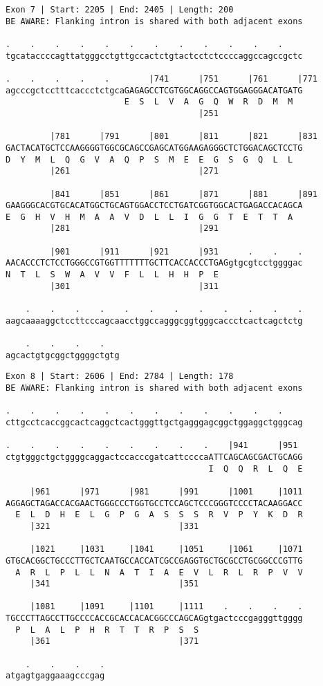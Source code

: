 \documentclass{article}
\begin{document}
\begin{Verbatim}[fontfamily=courier]
Exon 7 | Start: 2205 | End: 2405 | Length: 200
BE AWARE: Flanking intron is shared with both adjacent exons

.    .    .    .    .    .    .    .    .    .    .    .    
tgcataccccagttatgggcctgttgccactctgtactcctctccccaggccagccgctc

.    .    .    .    .        |741      |751      |761      |771
agcccgctcctttcaccctctgcaGAGAGCCTCGTGGCAGGCCAGTGGAGGGACATGATG
                        E  S  L  V  A  G  Q  W  R  D  M  M  
                                       |251                 

         |781      |791      |801      |811      |821      |831
GACTACATGCTCCAAGGGGTGGCGCAGCCGAGCATGGAAGAGGGCTCTGGACAGCTCCTG
D  Y  M  L  Q  G  V  A  Q  P  S  M  E  E  G  S  G  Q  L  L  
         |261                          |271                 

         |841      |851      |861      |871      |881      |891
GAAGGGCACGTGCACATGGCTGCAGTGGACCTCCTGATCGGTGGCACTGAGACCACAGCA
E  G  H  V  H  M  A  A  V  D  L  L  I  G  G  T  E  T  T  A  
         |281                          |291                 

         |901      |911      |921      |931      .    .    .
AACACCCTCTCCTGGGCCGTGGTTTTTTTGCTTCACCACCCTGAGgtgcgtcctggggac
N  T  L  S  W  A  V  V  F  L  L  H  H  P  E                 
         |301                          |311                 

    .    .    .    .    .    .    .    .    .    .    .    .
aagcaaaaggctccttcccagcaacctggccagggcggtgggcaccctcactcagctctg

    .    .    .    .   
agcactgtgcggctggggctgtg
\end{Verbatim}
\newpage
\begin{Verbatim}[fontfamily=courier]
Exon 8 | Start: 2606 | End: 2784 | Length: 178
BE AWARE: Flanking intron is shared with both adjacent exons

.    .    .    .    .    .    .    .    .    .    .    .    
cttgcctcaccggcactcaggctcactgggttgctgagggagcggctggaggctgggcag

.    .    .    .    .    .    .    .    .    |941      |951 
ctgtgggctgctggggcaggactccacccgatcattccccaATTCAGCAGCGACTGCAGG
                                         I  Q  Q  R  L  Q  E

     |961      |971      |981      |991      |1001     |1011
AGGAGCTAGACCACGAACTGGGCCCTGGTGCCTCCAGCTCCCGGGTCCCCTACAAGGACC
  E  L  D  H  E  L  G  P  G  A  S  S  S  R  V  P  Y  K  D  R
     |321                          |331                     

     |1021     |1031     |1041     |1051     |1061     |1071
GTGCACGGCTGCCCTTGCTCAATGCCACCATCGCCGAGGTGCTGCGCCTGCGGCCCGTTG
  A  R  L  P  L  L  N  A  T  I  A  E  V  L  R  L  R  P  V  V
     |341                          |351                     

     |1081     |1091     |1101     |1111    .    .    .    .
TGCCCTTAGCCTTGCCCCACCGCACCACACGGCCCAGCAGgtgactcccgagggttgggg
  P  L  A  L  P  H  R  T  T  R  P  S  S                     
     |361                          |371                     

    .    .    .    .
atgagtgaggaaagcccgag
\end{Verbatim}
\end{document}
